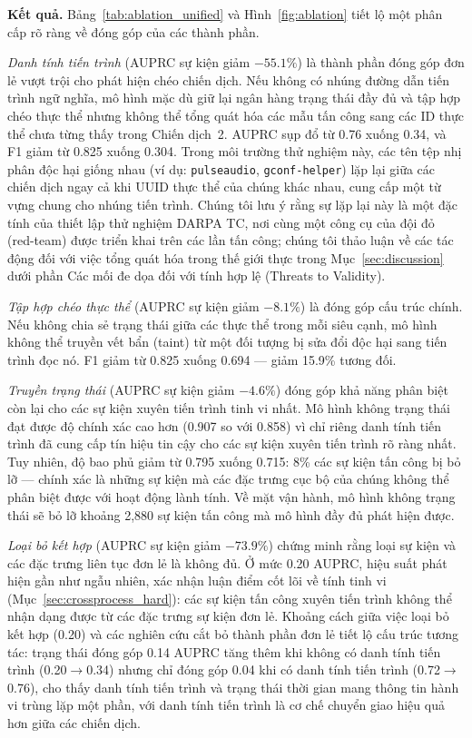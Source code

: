 \documentclass[letterpaper,twocolumn,10pt]{article}
\begin{document}


\textbf{Kết quả.} Bảng~\ref{tab:ablation_unified} và Hình~\ref{fig:ablation} tiết lộ một phân cấp rõ ràng về đóng góp của các thành phần.

\emph{Danh tính tiến trình} (AUPRC sự kiện giảm $-55.1\%$) là thành phần đóng góp đơn lẻ vượt trội cho phát hiện chéo chiến dịch. Nếu không có nhúng đường dẫn tiến trình ngữ nghĩa, mô hình mặc dù giữ lại ngân hàng trạng thái đầy đủ và tập hợp chéo thực thể nhưng không thể tổng quát hóa các mẫu tấn công sang các ID thực thể chưa từng thấy trong Chiến dịch~2. AUPRC sụp đổ từ 0.76 xuống 0.34, và F1 giảm từ 0.825 xuống 0.304. Trong môi trường thử nghiệm này, các tên tệp nhị phân độc hại giống nhau (ví dụ: \texttt{pulseaudio}, \texttt{gconf-helper}) lặp lại giữa các chiến dịch ngay cả khi UUID thực thể của chúng khác nhau, cung cấp một từ vựng chung cho nhúng tiến trình. Chúng tôi lưu ý rằng sự lặp lại này là một đặc tính của thiết lập thử nghiệm DARPA TC, nơi cùng một công cụ của đội đỏ (red-team) được triển khai trên các lần tấn công; chúng tôi thảo luận về các tác động đối với việc tổng quát hóa trong thế giới thực trong Mục~\ref{sec:discussion} dưới phần Các mối đe dọa đối với tính hợp lệ (Threats to Validity).

\emph{Tập hợp chéo thực thể} (AUPRC sự kiện giảm $-8.1\%$) là đóng góp cấu trúc chính. Nếu không chia sẻ trạng thái giữa các thực thể trong mỗi siêu cạnh, mô hình không thể truyền vết bẩn (taint) từ một đối tượng bị sửa đổi độc hại sang tiến trình đọc nó. F1 giảm từ 0.825 xuống 0.694 --- giảm 15.9\% tương đối.

\emph{Truyền trạng thái} (AUPRC sự kiện giảm $-4.6\%$) đóng góp khả năng phân biệt còn lại cho các sự kiện xuyên tiến trình tinh vi nhất. Mô hình không trạng thái đạt được độ chính xác cao hơn (0.907 so với 0.858) vì chỉ riêng danh tính tiến trình đã cung cấp tín hiệu tin cậy cho các sự kiện xuyên tiến trình rõ ràng nhất. Tuy nhiên, độ bao phủ giảm từ 0.795 xuống 0.715: 8\% các sự kiện tấn công bị bỏ lỡ --- chính xác là những sự kiện mà các đặc trưng cục bộ của chúng không thể phân biệt được với hoạt động lành tính. Về mặt vận hành, mô hình không trạng thái sẽ bỏ lỡ khoảng 2,880 sự kiện tấn công mà mô hình đầy đủ phát hiện được.

\emph{Loại bỏ kết hợp} (AUPRC sự kiện giảm $-73.9\%$) chứng minh rằng loại sự kiện và các đặc trưng liên tục đơn lẻ là không đủ. Ở mức 0.20 AUPRC, hiệu suất phát hiện gần như ngẫu nhiên, xác nhận luận điểm cốt lõi về tính tinh vi (Mục~\ref{sec:crossprocess_hard}): các sự kiện tấn công xuyên tiến trình không thể nhận dạng được từ các đặc trưng sự kiện đơn lẻ. Khoảng cách giữa việc loại bỏ kết hợp (0.20) và các nghiên cứu cắt bỏ thành phần đơn lẻ tiết lộ cấu trúc tương tác: trạng thái đóng góp 0.14 AUPRC tăng thêm khi không có danh tính tiến trình (0.20$\to$0.34) nhưng chỉ đóng góp 0.04 khi có danh tính tiến trình (0.72$\to$0.76), cho thấy danh tính tiến trình và trạng thái thời gian mang thông tin hành vi trùng lặp một phần, với danh tính tiến trình là cơ chế chuyển giao hiệu quả hơn giữa các chiến dịch.
\end{document}

